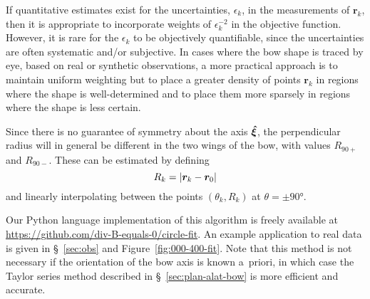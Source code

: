 If quantitative estimates exist for the uncertainties, \(\epsilon_k\), in the
measurements of \(\bm{r}_k\), then it is appropriate to incorporate
weights of \(\epsilon_k^{-2}\) in the objective function.  However, it is
rare for the \(\epsilon_k\) to be objectively quantifiable, since the
uncertainties are often systematic and/or subjective.  In cases
where the bow shape is traced by eye, based on real or synthetic
observations, a more practical approach is to maintain uniform
weighting but to place a greater density of points \(\bm{r}_k\) in
regions where the shape is well-determined and to place them more
sparsely in regions where the shape is less certain.

Since there is no guarantee of symmetry about the axis \(\bm{\hat{\xi}}\),
the perpendicular radius will in general be different in the two wings
of the bow, with values \(R_{90+}\) and \(R_{90-}\).  These can be
estimated by defining
\begin{equation}
  \label{eq:rcurv-R-k}
  R_k = \left\lvert\bm{r}_k - \bm{r}_0\right\rvert
\end{equation}
and linearly interpolating between the points \((\theta_k, R_k)\) at
\(\theta = \pm \ang{90}\).

Our Python language implementation of this algorithm is freely
available at \url{https://github.com/div-B-equals-0/circle-fit}.  An
example application to real data is given in \S~\ref{sec:obs} and
Figure~\ref{fig:000-400-fit}.  Note that this method is not necessary
if the orientation of the bow axis is known a~priori, in which case
the Taylor series method described in \S~\ref{sec:plan-alat-bow} is
more efficient and accurate.


